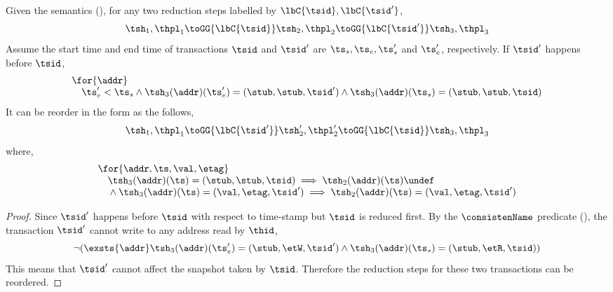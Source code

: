 \begin{lem}
\label{lem:reorder-the-future-and-past}
Given the semantics (), for any two reduction steps labelled by \( \lbC{\tsid}, \lbC{\tsid'} \),
\[
    \tsh_{1}, \thpl_{1} \toGG{\lbC{\tsid}} \tsh_{2}, \thpl_{2} \toGG{\lbC{\tsid'}} \tsh_{3}, \thpl_{3}
\]
Assume the start time and end time of transactions \( \tsid \) and \( \tsid' \) are \( \ts_{s}, \ts_{e}, \ts_{s}' \) and \( \ts_{e}' \), respectively.
If \( \tsid' \) happens before \( \tsid \), 
\[
\begin{array}{@{}l@{}}
    \for{\addr} \\
    \quad \ts_{e}' < \ts_{s}
    \land \tsh_{3}(\addr)(\ts_{e}') = (\stub, \stub, \tsid')
    \land \tsh_{3}(\addr)(\ts_{s}) = (\stub, \stub, \tsid)
\end{array}
\]
It can be reorder in the form as the follows,
\[
\begin{array}{@{}l@{}}
    \tsh_{1}, \thpl_{1} \toGG{\lbC{\tsid'}} \tsh_{2}', \thpl_{2}' \toGG{\lbC{\tsid}} \tsh_{3}, \thpl_{3}
\end{array}
\]
where,
\[
\begin{array}{@{}l@{}}
    \for{\addr, \ts,\val,\etag} \\
    \quad \tsh_{3}(\addr)(\ts) = (\stub, \stub, \tsid) \implies \tsh_{2}(\addr)(\ts) \undef \\ 
    \quad {} \land \tsh_{3}(\addr)(\ts) = (\val, \etag, \tsid') \implies \tsh_{2}(\addr)(\ts) = (\val, \etag, \tsid')
\end{array}
\]
\end{lem}
\begin{proof}
Since \( \tsid' \)  happens before \( \tsid \)  with respect to time-stamp but \( \tsid \) is reduced first.
By the \( \consistenName \) predicate (), the transaction \( \tsid' \) cannot write to any address read by \( \thid \),
\[
    \neg(\exsts{\addr} \tsh_{3}(\addr)(\ts_{e}') = (\stub, \etW,\tsid') \land \tsh_{3}(\addr)(\ts_{s}) = (\stub, \etR,\tsid))
\]
This means that \( \tsid' \) cannot affect the snapshot taken by \( \tsid \).
Therefore the reduction steps for these two transactions can be reordered.
\end{proof}

